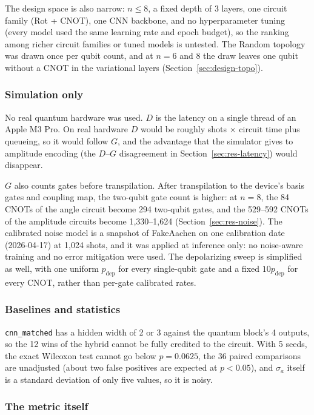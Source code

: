 \documentclass{ieeeaccess}
\newcommand{\pdep}{p_{\mathrm{dep}}}           %
\begin{document}
The design space is also narrow: $n \leq 8$, a fixed depth of 3 layers, one circuit family (Rot + CNOT), one CNN backbone, and no hyperparameter tuning (every model used the same learning rate and epoch budget), so the ranking among richer circuit families or tuned models is untested. The Random topology was drawn once per qubit count, and at $n = 6$ and 8 the draw leaves one qubit without a CNOT in the variational layers (Section~\ref{sec:design-topo}).

\subsubsection{Simulation only}
\label{sec:lim-sim}

No real quantum hardware was used. $D$ is the latency on a single thread of an Apple M3 Pro. On real hardware $D$ would be roughly shots $\times$ circuit time plus queueing, so it would follow $G$, and the advantage that the simulator gives to amplitude encoding (the $D$--$G$ disagreement in Section~\ref{sec:res-latency}) would disappear.

$G$ also counts gates before transpilation. After transpilation to the device's basis gates and coupling map, the two-qubit gate count is higher: at $n = 8$, the 84 CNOTs of the angle circuit become 294 two-qubit gates, and the 529--592 CNOTs of the amplitude circuits become 1,330--1,624 (Section~\ref{sec:res-noise}). The calibrated noise model is a snapshot of FakeAachen on one calibration date (2026-04-17) at 1,024 shots, and it was applied at inference only: no noise-aware training and no error mitigation were used. The depolarizing sweep is simplified as well, with one uniform $\pdep$ for every single-qubit gate and a fixed $10\pdep$ for every CNOT, rather than per-gate calibrated rates.

\subsubsection{Baselines and statistics}
\label{sec:lim-stats}

\texttt{cnn\_matched} has a hidden width of 2 or 3 against the quantum block's 4 outputs, so the 12 wins of the hybrid cannot be fully credited to the circuit. With 5 seeds, the exact Wilcoxon test cannot go below $p = 0.0625$, the 36 paired comparisons are unadjusted (about two false positives are expected at $p < 0.05$), and $\sigma_a$ itself is a standard deviation of only five values, so it is noisy.

\subsubsection{The metric itself}
\label{sec:lim-metric}
\end{document}
